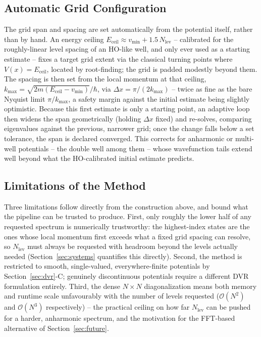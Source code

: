 \documentclass[10pt,conference]{IEEEtran}
\begin{document}
\subsection{Automatic Grid Configuration}
The grid span and spacing are set automatically from the potential itself, rather than by hand. An energy ceiling $E_{\text{ceil}}\approx v_{\min}+1.5\,N_{\text{lev}}$ -- calibrated for the roughly-linear level spacing of an HO-like well, and only ever used as a starting estimate -- fixes a target grid extent via the classical turning points where $V(x)=E_{\text{ceil}}$, located by root-finding; the grid is padded modestly beyond them. The spacing is then set from the local momentum at that ceiling, $k_{\max}=\sqrt{2m(E_{\text{ceil}}-v_{\min})}/\hbar$, via $\Delta x = \pi/(2k_{\max})$ -- twice as fine as the bare Nyquist limit $\pi/k_{\max}$, a safety margin against the initial estimate being slightly optimistic. Because this first estimate is only a starting point, an adaptive loop then widens the span geometrically (holding $\Delta x$ fixed) and re-solves, comparing eigenvalues against the previous, narrower grid; once the change falls below a set tolerance, the span is declared converged. This corrects for anharmonic or multi-well potentials -- the double well among them -- whose wavefunction tails extend well beyond what the HO-calibrated initial estimate predicts.

\subsection{Limitations of the Method}
Three limitations follow directly from the construction above, and bound what the pipeline can be trusted to produce. First, only roughly the lower half of any requested spectrum is numerically trustworthy: the highest-index states are the ones whose local momentum first exceeds what a fixed grid spacing can resolve, so $N_{\text{lev}}$ must always be requested with headroom beyond the levels actually needed (Section~\ref{sec:systems} quantifies this directly). Second, the method is restricted to smooth, single-valued, everywhere-finite potentials by Section~\ref{sec:dvr}-C; genuinely discontinuous potentials require a different DVR formulation entirely. Third, the dense $N\times N$ diagonalization means both memory and runtime scale unfavourably with the number of levels requested ($\mathcal{O}(N^2)$ and $\mathcal{O}(N^3)$ respectively) -- the practical ceiling on how far $N_{\text{lev}}$ can be pushed for a harder, anharmonic spectrum, and the motivation for the FFT-based alternative of Section~\ref{sec:future}.
\end{document}
